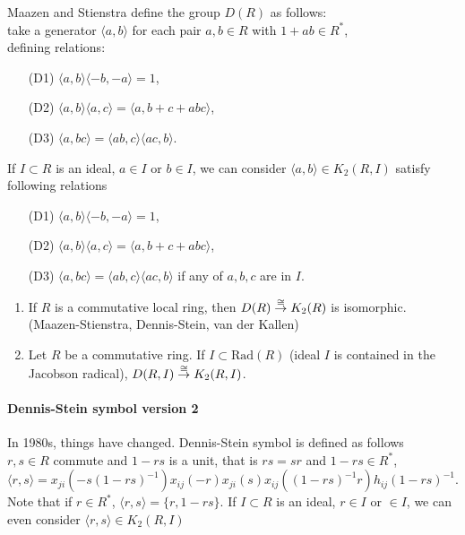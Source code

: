 Maazen and Stienstra define the group $D(R)$ as follows:\\
take a generator $\langle a,b \rangle$ for each pair $a,b\in R$ with $1+ab\in R^*$,\\
defining relations:
\begin{itemize}
	\item[(D1)] $\langle a,b\rangle \langle -b,-a \rangle=1$,\\
	\item[(D2)] $\langle a,b\rangle \langle a,c \rangle=\langle a,b+c+abc \rangle$, \\
	\item[(D3)] $\langle a,bc\rangle =\langle ab,c\rangle \langle ac,b\rangle$.
\end{itemize}
If $I\subset R$ is an ideal, $a\in I$ or $b\in I$, we can consider $\langle a,b\rangle \in K_2(R,I)$ satisfy following relations
\begin{itemize}
	\item[(D1)] $\langle a,b\rangle \langle -b,-a \rangle=1$,\\
	\item[(D2)] $\langle a,b\rangle \langle a,c \rangle=\langle a,b+c+abc \rangle$, \\
	\item[(D3)] $\langle a,bc\rangle =\langle ab,c\rangle \langle ac,b\rangle$ if any of $a,b,c$ are in $I$.
\end{itemize}
\begin{theorem}
	\begin{enumerate}
		\item If $R$ is a {\color{green} commutative local ring}, then $D(R)\overset{\cong}{\to} K_2(R)$ is isomorphic. (Maazen-Stienstra, Dennis-Stein, van der Kallen)\\
		\item Let $R$ be a commutative ring. If $I \subset \mathrm{Rad}(R)$ (ideal $I$ is contained in the Jacobson radical), $D(R,I)\overset{\cong}{\to} K_2(R,I)$.
	\end{enumerate}
	
\end{theorem}


\paragraph{Dennis-Stein symbol {\color{green}version 2}} %
\label{par:dennis_stein_symbol_greenversion_2_}
In 1980s, things have changed. Dennis-Stein symbol is defined as follows\\
$r,s\in R$ commute and $1-rs$ is a unit, that is $rs=sr$ and $1-rs\in R^*$,
\[\langle r,s \rangle = x_{ji}(-s(1-rs)^{-1})x_{ij}(-r)x_{ji}(s)x_{ij}((1-rs)^{-1}r)h_{ij}(1-rs)^{-1}.\]
Note that if $r\in R^*$, $\langle r,s \rangle =\{r,1-rs\}$. If $I\subset R$ is an ideal, $r\in I$ or $\in I$, we can even consider $\langle r,s\rangle \in K_2(R,I)$

